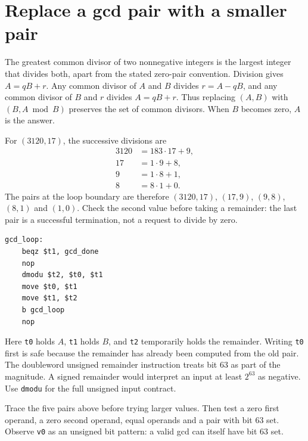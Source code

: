 \section{Replace a gcd pair with a smaller pair}
The greatest common divisor of two nonnegative integers is the largest integer that
divides both, apart from the stated zero-pair convention. Division gives
\(A=qB+r\). Any common divisor of \(A\) and \(B\) divides \(r=A-qB\), and any common
divisor of \(B\) and \(r\) divides \(A=qB+r\). Thus replacing \((A,B)\) with
\((B,A\bmod B)\) preserves the set of common divisors. When \(B\) becomes zero,
\(A\) is the answer.

For \((3120,17)\), the successive divisions are
\[
  \begin{aligned}
    3120 & =183\cdot17+9, \\
    17   & =1\cdot9+8,    \\
    9    & =1\cdot8+1,    \\
    8    & =8\cdot1+0.
  \end{aligned}
\]
The pairs at the loop boundary are therefore \((3120,17)\), \((17,9)\), \((9,8)\),
\((8,1)\) and \((1,0)\). Check the second value before taking a remainder: the
last pair is a successful termination, not a request to divide by zero.

\begin{verbatim}
gcd_loop:
    beqz $t1, gcd_done
    nop
    dmodu $t2, $t0, $t1
    move $t0, $t1
    move $t1, $t2
    b gcd_loop
    nop
\end{verbatim}

Here \texttt{t0} holds \(A\), \texttt{t1} holds \(B\), and \texttt{t2} temporarily
holds the remainder. Writing \texttt{t0} first is safe because the remainder has already
been computed from the old pair. The doubleword unsigned remainder instruction treats
bit 63 as part of the magnitude. A signed remainder would interpret an input at least
\(2^{63}\) as negative. Use \texttt{dmodu} for the full unsigned input contract.

Trace the five pairs above before trying larger values. Then test a zero first
operand, a zero second operand, equal operands and a pair with bit 63 set. Observe
\texttt{v0} as an unsigned bit pattern: a valid gcd can itself have bit 63 set.
